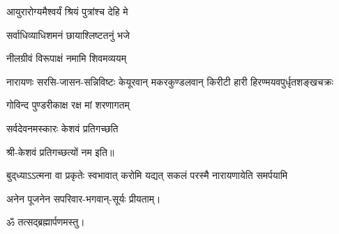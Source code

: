\begin{center}

{आयुरारोग्यमैश्वर्यं श्रियं पुत्रांश्च देहि मे}

{सर्वाधिव्याधिशमनं छायाश्लिष्टतनुं भजे}

{नीलग्रीवं विरूपाक्षं नमामि शिवमव्ययम्}

{नारायणः सरसि-जासन-सन्निविष्टः}
{केयूरवान् मकरकुण्डलवान् किरीटी}
{हारी हिरण्मयवपुर्धृतशङ्खचक्रः}

{गोविन्द पुण्डरीकाक्ष रक्ष मां शरणागतम्}

{सर्वदेवनमस्कारः केशवं प्रतिगच्छति}

श्री-केशवं प्रतिगच्छत्यों नम इति॥



{बुद्‌ध्याऽऽत्मना वा प्रकृतेः स्वभावात्}
{करोमि यद्यत् सकलं परस्मै}
{नारायणायेति समर्पयामि}

अनेन पूजनेन सपरिवार-भगवान्-सूर्यः प्रीयताम्। \\
\end{center}

\centerline{ॐ तत्सद्ब्रह्मार्पणमस्तु।}

\begingroup
\let\chapt\sect
\begin{center}


\end{center}
\endgroup

\closesection
